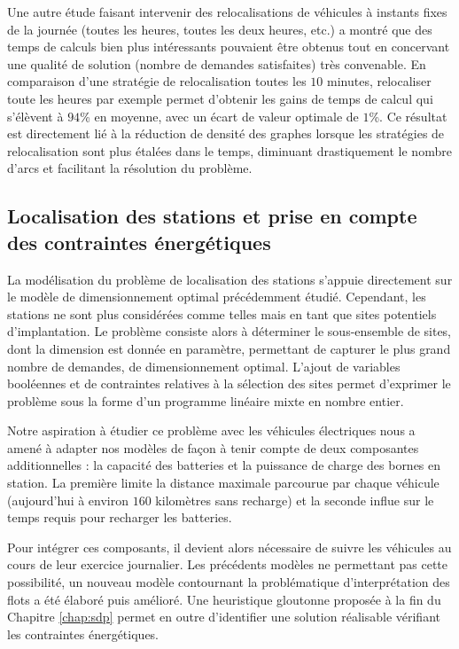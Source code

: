 \medskip
Une autre étude faisant intervenir des relocalisations de véhicules à instants fixes de la journée (toutes les heures, toutes les deux heures, etc.) a montré que des temps de calculs bien plus intéressants pouvaient être obtenus tout en concervant une qualité de solution (nombre de demandes satisfaites) très convenable.
En comparaison d'une stratégie de relocalisation toutes les $10$ minutes, relocaliser toute les heures par exemple permet d'obtenir les gains de temps de calcul qui s'élèvent à $94$\% en moyenne, avec un écart de valeur optimale de $1$\%.
Ce résultat est directement lié à la réduction de densité des graphes lorsque les stratégies de relocalisation sont plus étalées dans le temps, diminuant drastiquement le nombre d'arcs et facilitant la résolution du problème.

\newpage
\subsection*{Localisation des stations et prise en compte des contraintes énergétiques}

La modélisation du problème de localisation des stations s'appuie directement sur le modèle de dimensionnement optimal précédemment étudié.
Cependant, les stations ne sont plus considérées comme telles mais en tant que sites potentiels d'implantation.
Le problème consiste alors à déterminer le sous-ensemble de sites, dont la dimension est donnée en paramètre, permettant de capturer le plus grand nombre de demandes, \ie de dimensionnement optimal.
L'ajout de variables booléennes et de contraintes relatives à la sélection des sites permet d'exprimer le problème sous la forme d'un programme linéaire mixte en nombre entier.

\medskip
Notre aspiration à étudier ce problème avec les véhicules électriques nous a amené à adapter nos modèles de façon à tenir compte de deux composantes additionnelles : la capacité des batteries et la puissance de charge des bornes en station.
La première limite la distance maximale parcourue par chaque véhicule (aujourd'hui à environ $160$ kilomètres sans recharge) et la seconde influe sur le temps requis pour recharger les batteries.

Pour intégrer ces composants, il devient alors nécessaire de suivre les véhicules au cours de leur exercice journalier.
Les précédents modèles ne permettant pas cette possibilité, un nouveau modèle contournant la problématique d'interprétation des flots a été élaboré puis amélioré.
Une heuristique gloutonne proposée à la fin du Chapitre \ref{chap:sdp} permet en outre d'identifier une solution réalisable vérifiant les contraintes énergétiques.


